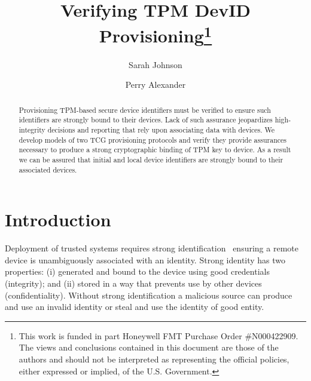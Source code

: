 \documentclass[runningheads]{llncs}
\begin{document}
%
\title{Verifying TPM DevID Provisioning\thanks{This work is funded in part
    Honeywell FMT Purchase Order
    \#N000422909. The views and conclusions contained in this document
    are those of the authors and should not be interpreted as
    representing the official policies, either expressed or implied,
    of the U.S. Government.}}
%
%
\author{Sarah Johnson \and
Perry Alexander}
%
%
%
\maketitle              %
%
\begin{abstract}
  Provisioning TPM-based secure device identifiers must be verified
  to ensure such identifiers are strongly bound to their devices.
  Lack of such assurance jeopardizes high-integrity decisions and
  reporting that rely upon associating data with devices.  We develop
  models of two TCG provisioning protocols and verify they provide
  assurances necessary to produce a strong cryptographic binding
  of TPM key to device.  As a result we can be assured that initial
  and local device identifiers are strongly bound to their associated
  devices.

\end{abstract}
%
%
%
\section{Introduction}

Deployment of trusted systems requires strong
identification~\citep{Martin:08:The-ten-page-in} ensuring a remote
device is unambiguously associated with an identity. Strong identity
has two properties: (i) generated and bound to the device using good
credentials (integrity); and (ii) stored in a way that prevents use by
other devices (confidentiality).  Without strong identification a
malicious source can produce and use an invalid identity or steal and
use the identity of good entity.
\end{document}
